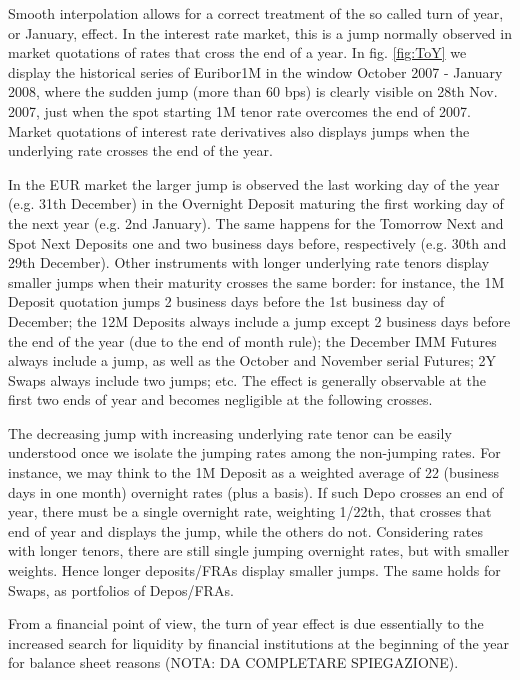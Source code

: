 \documentclass[11pt,reqno]{amsart}
\begin{document}
Smooth interpolation allows for a correct treatment of the so called turn of year, or January, effect.
In the interest rate market, this is a jump normally observed in market quotations of rates that cross the end of a year. In fig. \ref{fig:ToY} we display the historical series of Euribor1M in the window October 2007 - January 2008, where the sudden jump (more than 60 bps) is clearly visible on 28th Nov. 2007, just when the spot starting 1M tenor rate overcomes the end of 2007.
Market quotations of interest rate derivatives also displays jumps when the underlying rate crosses the end of the year.
\par
In the EUR market the larger jump is observed the last working day of the year (e.g. 31th December) in the Overnight Deposit maturing the first working day of the next year (e.g. 2nd January).
The same happens for the Tomorrow Next and Spot Next Deposits one and two business days before, respectively (e.g. 30th and 29th December).
Other instruments with longer underlying rate tenors display smaller jumps when their maturity crosses the same border: for instance, the 1M Deposit quotation jumps 2 business days before the 1st business day of December; the 12M Deposits always include a jump except 2 business days before the end of the year (due to the end of month rule); the December IMM Futures always include a jump, as well as the October and November serial Futures; 2Y Swaps always include two jumps; etc.
The effect is generally observable at the first two ends of year and becomes negligible at the following crosses.
\par
The decreasing jump with increasing underlying rate tenor can be easily understood once we isolate the jumping rates among the non-jumping rates.
For instance, we may think to the 1M Deposit as a weighted average of 22 (business days in one month) overnight rates (plus a basis). If such Depo crosses an end of year, there must be a single overnight rate, weighting 1/22th, that crosses that end of year and displays the jump, while the others do not. Considering rates with longer tenors, there are still single jumping overnight rates, but with smaller weights. Hence longer deposits/FRAs display smaller jumps. The same holds for Swaps, as portfolios of Depos/FRAs.
\par
From a financial point of view, the turn of year effect is due essentially to the increased search for liquidity by financial institutions at the beginning of the year for balance sheet reasons (NOTA: DA COMPLETARE SPIEGAZIONE).
\par
\end{document}
